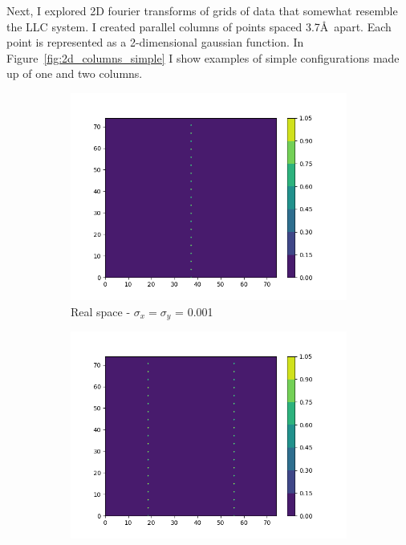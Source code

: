 \documentclass{article}
\begin{document}
Next, I explored 2D fourier transforms of grids of data that somewhat resemble 
the LLC system. I created parallel columns of points spaced 3.7\AA~apart. Each
point is represented as a 2-dimensional gaussian function. In Figure~\ref{fig:2d_columns_simple}
I show examples of simple configurations made up of one and two columns. 

\begin{figure}[h]
	\begin{subfigure}{0.45\textwidth}
	        \centering
                \includegraphics[width=\textwidth]{real_2d_1column.png}
                \caption{Real space - $\sigma_x=\sigma_y$ = 0.001}\label{fig:real_2d_1column}
        \end{subfigure}
        \begin{subfigure}{0.45\textwidth}
                \centering
                \includegraphics[width=\textwidth]{real_2d_2column.png}

\end{subfigure}
\end{figure}
\end{document}
